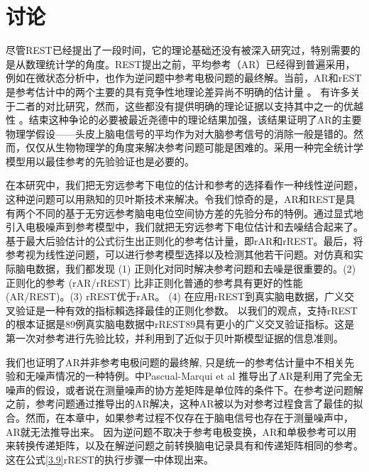 \section{讨论}
尽管REST已经提出了一段时间，它的理论基础还没有被深入研究过，特别需要的是从数理统计学的角度。REST提出之前，平均参考（AR）已经得到普遍采用，例如在微状态分析中，也作为逆问题中参考电极问题的最终解。当前，AR和rEST是参考估计中的两个主要的具有竞争性地理论差异尚不明确的估计量 。 有许多关于二者的对比研究，然而，这些都没有提供明确的理论证据以支持其中之一的优越性
。结束这种争论的必要被最近尧德中的理论结果加强，该结果证明了AR的主要物理学假设——头皮上脑电信号的平均作为对大脑参考信号的消除一般是错的。然而，仅仅从生物物理学的角度来解决参考问题可能是困难的。采用一种完全统计学模型用以最佳参考的先验验证也是必要的。

在本研究中，我们把无穷远参考下电位的估计和参考的选择看作一种线性逆问题，这种逆问题可以用熟知的贝叶斯技术来解决。令我们惊奇的是，AR和REST是具有两个不同的基于无穷远参考脑电电位空间协方差的先验分布的特例。通过显式地引入电极噪声到参考模型中，我们就把无穷远参考下电位估计和去噪结合起来了。基于最大后验估计的公式衍生出正则化的参考估计量，即rAR和rREST。最后，将参考视为线性逆问题，可以进行参考模型选择以及检测其他若干问题。对仿真和实际脑电数据，我们都发现 (1) 正则化对同时解决参考问题和去噪是很重要的。(2) 正则化的参考 (rAR/rREST) 比非正则化普通的参考具有更好的性能
(AR/REST)。(3) rREST优于rAR。 (4) 在应用rREST到真实脑电数据，广义交叉验证是一种有效的指标賴选择最佳的正则化参数。 以我们的观点，支持rREST的根本证据是89例真实脑电数据中rREST89具有更小的广义交叉验证指标。这是第一次对参考进行先验比较，并利用到了近似于贝叶斯模型证据的信息准则。

我们也证明了AR并非参考电极问题的最终解, 只是统一的参考估计量中不相关先验和无噪声情况的一种特例。\cite{pascual-marqui_assessing_2011}中Pascual-Marqui et al 推导出了AR是利用了完全无噪声的假设，或者说在测量噪声的协方差矩阵是单位阵的条件下。在参考逆问题解之前，参考问题通过推导出的AR解决，这种AR被以为对参考过程食言了最佳的拟合。然而，在本章中，如果参考过程不仅存在于脑电信号也存在于测量噪声中，AR就无法推导出来。 因为逆问题不取决于参考电极变换，AR和单极参考可以用来转换传递矩阵，以及在解逆问题之前转换脑电记录具有和传递矩阵相同的参考。 这在公式\eqref{3.9}rREST的执行步骤一中体现出来。 

